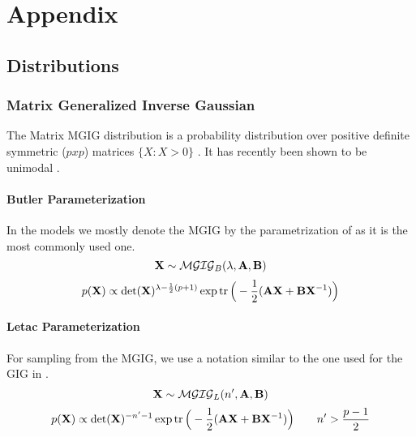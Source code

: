 \chapter{Appendix}
\section{Distributions}
\subsection{Matrix Generalized Inverse Gaussian}
The Matrix \gls{MGIG} distribution is a probability distribution over positive definite symmetric ($pxp$) matrices $\{X:X>0\}$ \citet{butler_generalized_1998}.
It has recently been shown to be unimodal \citep{fazayeli2016matrix}.

\subsubsection{Butler Parameterization}
\label{MGIG_BUTLER}
In the models we mostly denote the \gls{MGIG} by the parametrization of \citet{butler_generalized_1998}
as it is the most commonly used one.
\begin{equation}
\mathbf{X} \sim \mathcal{MGIG}_{B}(\lambda, \mathbf{A}, \mathbf{B}) 
\end{equation}
\begin{equation*}
p(\mathbf{X}) \propto \det(\mathbf{X})^{\lambda - \frac{1}{2}(p+1)}
\exp \operatorname{tr}
\Big(
	-\frac{1}{2} (\mathbf{A}\mathbf{X} + \mathbf{B} \mathbf{X}^{-1} )
\Big)
\end{equation*}

\subsubsection{Letac Parameterization}
\label{MGIG_LETAC}
For sampling from the \gls{MGIG}, we use a notation similar to the one used for the \gls{GIG} in \cite{letac1983characterization}.
\begin{equation}
\mathbf{X} \sim \mathcal{MGIG}_{L}(n', \mathbf{A}, \mathbf{B}) 
\end{equation}
\begin{equation*}
p(\mathbf{X}) \propto \det(\mathbf{X})^{-n' - 1}
\exp \operatorname{tr}
\Big(
-\frac{1}{2} (\mathbf{A}\mathbf{X} + \mathbf{B} \mathbf{X}^{-1} )
\Big)
\qquad
n'>\frac{p-1}{2}
\end{equation*}

